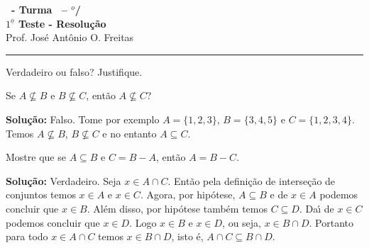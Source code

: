 \documentclass[12pt]{exam}
\begin{document}
\begin{center}
{\Large\bf \disciplina\ - Turma \turma\ -- \semestre$^{o}$/\ano} \\ \vspace{9pt} {\large\bf
$1^{\underline{o}}$ Teste - Resolu\c{c}\~ao}\\
\vspace{9pt} Prof. Jos{\'e} Ant{\^o}nio O. Freitas
\end{center}
\hrule

\vspace{.6cm}


\vspace{.6cm}

\questao Verdadeiro ou falso? Justifique.
\begin{center}
    Se $A \nsubseteq B$ e $B \nsubseteq C$, ent\~ao $A \nsubseteq C$?
\end{center}

\noindent\textbf{Solu\c{c}\~ao:} Falso. Tome por exemplo $A = \{1, 2, 3\}$, $B = \{3, 4, 5\}$ e $C = \{1, 2, 3, 4\}$. Temos $A \nsubseteq B$, $B \nsubseteq C$ e no entanto $A \subseteq C$.

\vspace{.5cm}

\questao Mostre que se $A \subseteq B$ e $C = B - A$, ent\~ao $A = B - C$.

\noindent\textbf{Solu\c{c}\~ao:} Verdadeiro. Seja $x \in A \cap C$. Ent\~ao pela defini\c{c}\~ao de interse\c{c}\~ao de conjuntos temos $x \in A$ e $x \in C$. Agora, por hip\'otese, $A \subseteq B$ e de $x \in A$ podemos concluir que $x \in B$. Al\'em disso, por hip\'otese tamb\'em temos $C \subseteq D$. Da{\'\i} de $x \in C$ podemos concluir que $x \in D$. Logo $x \in B$ e $x \in D$, ou seja, $x \in B \cap D$. Portanto para todo $x \in A \cap C$ temos $x \in B \cap D$, isto \'e, $A \cap C \subseteq B \cap D$.
\end{document}
